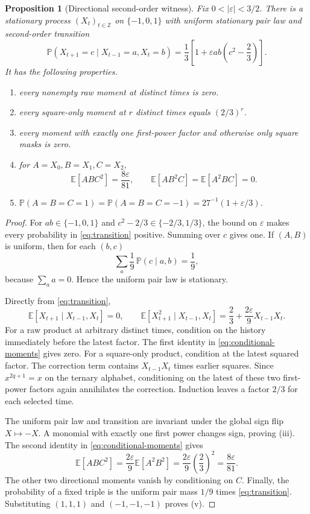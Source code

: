 \documentclass[11pt]{article}
\newtheorem{proposition}[theorem]{Proposition}
\theoremstyle{definition}
\theoremstyle{remark}
\newcommand{\E}{\mathbb E}
\newcommand{\Pp}{\mathbb P}
\begin{document}
\begin{proposition}[Directional second-order witness]
Fix $0<|\varepsilon|<3/2$.  There is a stationary process
$(X_t)_{t\in\mathbb Z}$ on $\{-1,0,1\}$ with uniform stationary pair law and
second-order transition
\begin{equation}
 \Pp(X_{t+1}=c\mid X_{t-1}=a,X_t=b)
 =\frac13\left[1+\varepsilon ab\left(c^2-\frac23\right)\right].
 \label{eq:transition}
\end{equation}
It has the following properties.
\begin{enumerate}[label=(\roman*),leftmargin=*]
\item every nonempty raw moment at distinct times is zero.
\item every square-only moment at $r$ distinct times equals $(2/3)^r$.
\item every moment with exactly one first-power factor and otherwise only
      square masks is zero.
\item for $A=X_0,B=X_1,C=X_2$,
\[
 \E[ABC^2]=\frac{8\varepsilon}{81},\qquad
 \E[AB^2C]=\E[A^2BC]=0.
\]
\item
$\Pp(A=B=C=1)=\Pp(A=B=C=-1)=
  27^{-1}(1+\varepsilon/3)$.
\end{enumerate}
\end{proposition}

\begin{proof}
For $ab\in\{-1,0,1\}$ and $c^2-2/3\in\{-2/3,1/3\}$, the bound on
$\varepsilon$ makes every probability in \eqref{eq:transition} positive.
Summing over $c$ gives one.  If $(A,B)$ is uniform, then for each $(b,c)$
\[
 \sum_a\frac19\,\Pp(c\mid a,b)=\frac19,
\]
because $\sum_aa=0$.  Hence the uniform pair law is stationary.

Directly from \eqref{eq:transition},
\begin{equation}
 \E[X_{t+1}\mid X_{t-1},X_t]=0,
 \qquad
 \E[X_{t+1}^2\mid X_{t-1},X_t]
 =\frac23+\frac{2\varepsilon}{9}X_{t-1}X_t.
 \label{eq:conditional-moments}
\end{equation}
For a raw product at arbitrary distinct times, condition on the history
immediately before the latest factor.  The first identity in
\eqref{eq:conditional-moments} gives zero.  For a square-only product,
condition at the latest squared factor.  The correction term contains
$X_{t-1}X_t$ times earlier squares.  Since $x^{2q+1}=x$ on the ternary
alphabet, conditioning on the latest of these two first-power factors again
annihilates the correction.  Induction leaves a factor $2/3$ for each
selected time.

The uniform pair law and transition are invariant under the global sign
flip $X\mapsto-X$.  A monomial with exactly one first power changes sign,
proving (iii).  The second identity in \eqref{eq:conditional-moments} gives
\[
 \E[ABC^2]=\frac{2\varepsilon}{9}\E[A^2B^2]
 =\frac{2\varepsilon}{9}\left(\frac23\right)^2
 =\frac{8\varepsilon}{81}.
\]
The other two directional moments vanish by conditioning on $C$.  Finally,
the probability of a fixed triple is the uniform pair mass $1/9$ times
\eqref{eq:transition}.  Substituting $(1,1,1)$ and $(-1,-1,-1)$ proves (v).
\end{proof}
\end{document}
